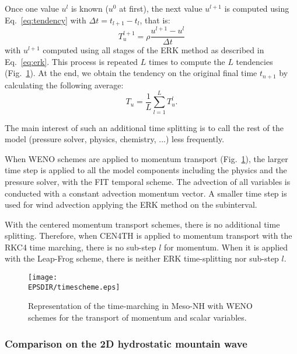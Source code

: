Once one value $u^l$ is known ($u^0$ at first), the next value $u^{l+1}$ is computed using Eq.~\eqref{eq:tendency} with $\Delta t = t_{l+1} - t_l$, that is:
\begin{equation}
T_u^{l+1} = \rho \frac{u^{l+1}-u^{l}}{\Delta t}
\end{equation}
with $u^{l+1}$ computed using all stages of the ERK method as described in Eq.~\eqref{eq:erk}. This process is repeated $L$ times to compute the $L$ tendencies (Fig.~\ref{fig:time}). At the end, we obtain the tendency on the original final time $t_{n+1}$ by calculating the following average:
\begin{equation}
T_u = \frac{1}{L}\sum_{l=1}^{L} T_u^l.
\end{equation}

The main interest of such an additional time splitting is to call the rest of the model (pressure solver, physics, chemistry, ...) less frequently.



When WENO schemes are applied to momentum transport (Fig.~\ref{fig:time}), the larger time step is applied to all the model components including the physics and the pressure solver, with the FIT temporal scheme. The advection of all variables is conducted with a constant advection momentum vector.
A smaller time step is used for wind advection applying the ERK method on the subinterval. 

\noindent With the centered momentum transport schemes, there is no additional time splitting.
Therefore, when CEN4TH is applied to momentum transport with the RKC4 time marching, there is no sub-step $l$ for momentum. When it is applied with the Leap-Frog scheme, there is neither ERK time-splitting nor sub-step $l$.



\begin{figure}[t]
 \centering
    \texttt{[image: \\EPSDIR/timescheme.eps]}
    \caption{Representation of the time-marching in Meso-NH with WENO schemes for the transport of momentum and scalar variables.}
    \label{fig:time}
\end{figure}


\subsubsection{Comparison on the 2D hydrostatic mountain wave}


